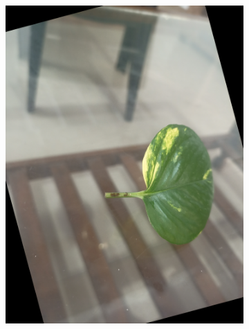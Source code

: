 \documentclass[twocolumn]{article}
\begin{document}
\begin{figure}[H]
\begin{subfigure}[b]{0.30\columnwidth}
        \includegraphics[width=\textwidth]{money8}
    \end{subfigure}
    \hfill
    \begin{subfigure}[b]{0.30\columnwidth}

\end{subfigure}
\end{figure}
\end{document}
